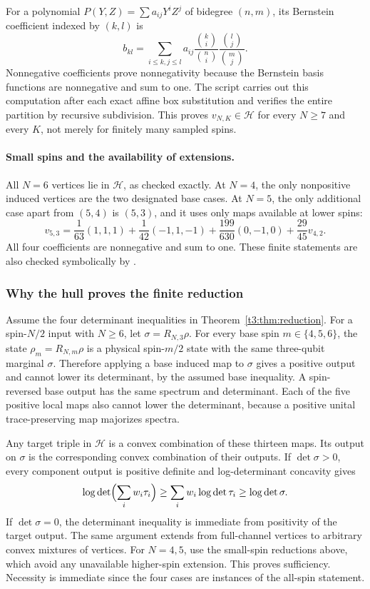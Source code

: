 \documentclass[11pt,a4paper]{article}
\begin{document}
For a polynomial $P(Y,Z)=\sum a_{ij}Y^iZ^j$ of bidegree $(n,m)$,
its Bernstein coefficient indexed by $(k,l)$ is
\[
 b_{kl}=\sum_{i\le k,j\le l}a_{ij}
          \frac{\binom{k}{i}}{\binom{n}{i}}
          \frac{\binom{l}{j}}{\binom{m}{j}}.
\]
Nonnegative coefficients prove nonnegativity because the Bernstein
basis functions are nonnegative and sum to one. The script
 carries out this computation after
each exact affine box substitution and verifies the entire partition
by recursive subdivision. This proves $v_{N,K}\in\mathcal H$ for
every $N\ge7$ and every $K$, not merely for finitely many sampled spins.

\paragraph{Small spins and the availability of extensions.}
All $N=6$ vertices lie in $\mathcal H$, as checked exactly. At $N=4$,
the only nonpositive induced vertices are the two designated base
cases. At $N=5$, the only additional case apart from $(5,4)$ is
$(5,3)$, and it uses only maps available at lower spins:
\[
 v_{5,3}=\frac1{63}(1,1,1)+\frac1{42}(-1,1,-1)
          +\frac{199}{630}(0,-1,0)+\frac{29}{45}v_{4,2}.
\]
All four coefficients are nonnegative and sum to one. These finite
statements are also checked symbolically by .

\subsubsection{Why the hull proves the finite reduction}
Assume the four determinant inequalities in Theorem~\ref{t3:thm:reduction}.
For a spin-$N/2$ input with $N\ge6$, let $\sigma=R_{N,3}\rho$.
For every base spin $m\in\{4,5,6\}$, the state
$\rho_m=R_{N,m}\rho$ is a physical spin-$m/2$ state with the same
three-qubit marginal $\sigma$. Therefore applying a base induced map
to $\sigma$ gives a positive output and cannot lower its determinant,
by the assumed base inequality. A spin-reversed base output has the
same spectrum and determinant. Each of the five positive local maps
also cannot lower the determinant, because a positive unital
trace-preserving map majorizes spectra.

Any target triple in $\mathcal H$ is a convex combination of these
thirteen maps. Its output on $\sigma$ is the corresponding convex
combination of their outputs. If $\det\sigma>0$, every component
output is positive definite and log-determinant concavity gives
\[
 \log\det\Bigl(\sum_iw_i\tau_i\Bigr)
 \ge\sum_iw_i\log\det\tau_i\ge\log\det\sigma.
\]
If $\det\sigma=0$, the determinant inequality is immediate from
positivity of the target output. The same argument extends from
full-channel vertices to arbitrary convex mixtures of vertices.
For $N=4,5$, use the small-spin reductions above, which avoid any
unavailable higher-spin extension. This proves sufficiency.
Necessity is immediate since the four cases are instances of the
all-spin statement.
\end{document}
